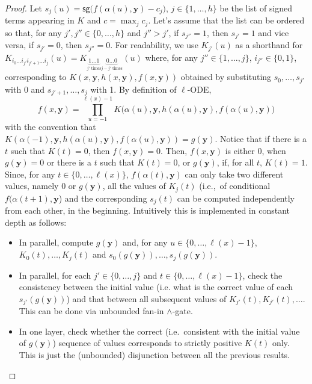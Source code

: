 \documentclass[11pt, oneside]{article}
\newcommand{\fun}[1]{\mathsf{#1}}
\newcommand{\tu}[1]{\mathbf{#1}}
\theoremstyle{definition}
\begin{document}
\begin{toappendix}
\begin{proof}
    Let $s_j(u)= \fun{sg}\big(f(\alpha(u), \tu y)-c_j\big)$, $j\in \{1,\dots, h\}$ be the list of signed terms appearing in $K$ and $c=\max_j c_j$.
    Let's assume that the list can be ordered so that, for any $j', j''\in \{0,\dots,h\}$ and $j''>j'$, if $s_{j''}=1$, then $s_{j'}=1$ and vice versa, if $s_{j'}=0$, then $s_{j''}=0$.
    For readability, we use $K_{j'}(u)$ as a shorthand for $K_{i_0\dots i_{j'} i_{j'+1}\dots i_j}(u)= K_{\underbrace{1\dots 1}_{j' \text{ times}}\underbrace{0\dots 0}_{j-j' \text{ times}}}(u)$ where, for any $j''\in \{1,\dots, j\}$, $i_{j''}\in \{0,1\}$, corresponding to $K(x, \tu y, h(x, \tu y), f(x, \tu y))$ obtained by substituting $s_0, \dots, s_{j'}$ with 0 and $s_{j'+1},\dots, s_{j}$ with 1.
    By definition of $\ell$-ODE,
    $$
    f(x, \tu y) = \prod^{\ell(x)-1}_{u=-1} K\big(\alpha (u), \tu y, h(\alpha(u), \tu y), f(\alpha(u), \tu y)\big)
    $$
    with the convention that $K(\alpha(-1), \tu y, h(\alpha(u), \tu y), f(\alpha(u), \tu y))=g(\tu y)$.
    Notice that if there is a $t$ such that $K(t)= 0$, then $f(x, \tu y)=0$.
    Then, $f(x, \tu y)$ is either 0, when $g(\tu y)=0$ or there is a $t$ such that $K(t)=0$,
    or $g(\tu y)$, if, for all $t$, $K(t)=1$.
    Since, for any $t\in \{0,\dots, \ell(x)\}$, $f(\alpha(t),\tu y)$ can only take two different values, namely 0 or $g(\tu y)$, all the values of $K_j(t)$ (i.e.,~of conditional $f(\alpha(t+1), \tu y$) and the corresponding $s_j(t)$ can be computed independently from each other, in the beginning.
    Intuitively this is implemented in constant depth as follows:
    \begin{itemize}
    \itemsep0em
        \item In parallel, compute $g(\tu y)$ and, for any $u\in \{0,\dots, \ell(x)-1\}$, $K_{0}(t), \dots, K_{j}(t)$ and $s_0(g(\tu y)), \dots, s_j(g(\tu y))$.
        \item In parallel, for each $j'\in \{0,\dots, j\}$ and $t\in \{0,\dots, \ell(x)-1\}$, check the consistency between the initial value (i.e. what is the correct value of each $s_{j'}(g(\tu y))$) and that between all subsequent values of $K_{j'}(t), K_{j'}(t), \dots$.
        This can be done via unbounded fan-in $\wedge$-gate.
        \item In one layer, check whether the correct (i.e.~consistent with the initial value of $g(\tu y)$) sequence of values corresponds to strictly positive $K(t)$ only. This is just the (unbounded) disjunction between all the previous results.

\end{itemize}
\end{proof}
\end{toappendix}
\end{document}

